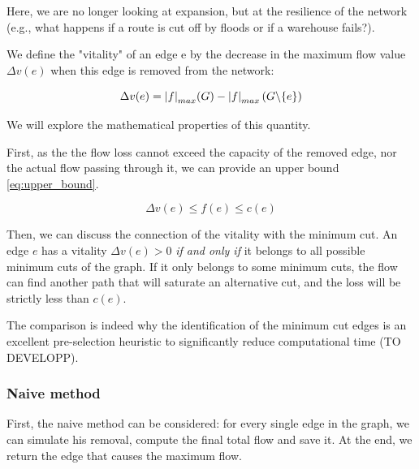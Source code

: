 \documentclass[12pt, openany]{article}
\begin{document}
Here, we are no longer looking at expansion, but at the resilience of the network (e.g., what happens if a route is cut off by floods or if a warehouse fails?).

We define the "vitality" of an edge e by the decrease in the maximum flow value $\Delta v(e)$ when this edge is removed from the network:

\begin{equation}
    \Delta v(e) = \abs{f}_{max}(G) - \abs{f}_{max}\left(G \backslash\{e\}\right)
\end{equation}

We will explore the mathematical properties of this quantity.

First, as the the flow loss cannot exceed the capacity of the removed edge, nor the actual flow passing through it, we can provide an upper bound \eqref{eq:upper_bound}.

\begin{equation}\label{eq:upper_bound}
    \Delta v(e) \leq f(e) \leq c(e)
\end{equation}

Then, we can discuss the connection of the vitality with the minimum cut. An edge $e$ has a vitality $\Delta v(e) > 0$ \textit{if and only if} it belongs to all possible minimum cuts of the graph. If it only belongs to some minimum cuts, the flow can find another path that will saturate an alternative cut, and the loss will be strictly less than $c(e)$.

The comparison is indeed why the identification of the minimum cut edges is an excellent pre-selection heuristic to significantly reduce computational time (TO DEVELOPP).

\subsubsection{Naive method}\label{sec:2_naive_method}

First, the naive method can be considered: for every single edge in the graph, we can simulate his removal, compute the final total flow and save it. At the end, we return the edge that causes the maximum flow.
\end{document}
